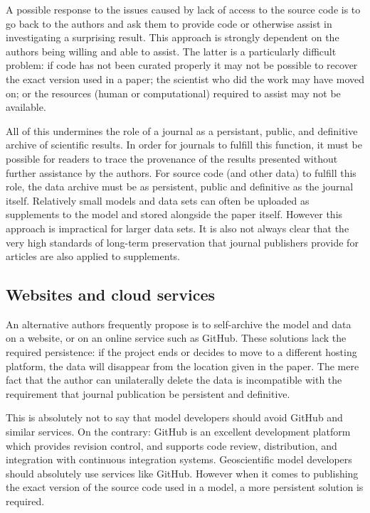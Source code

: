 \documentclass[a4paper,11pt]{article}
\begin{document}
A possible response to the issues caused by lack of access to the source
code is to go back to the authors and ask them to provide code or otherwise
assist in investigating a surprising result. This approach is strongly
dependent on the authors being willing and able to assist. The latter is a
particularly difficult problem: if code has not been curated properly it may
not be possible to recover the exact version used in a paper; the scientist
who did the work may have moved on; or the resources (human or
computational) required to assist may not be available.

All of this undermines the role of a journal as a persistant, public, and
definitive archive of scientific results. In order for journals to fulfill
this function, it must be possible for readers to trace the provenance of
the results presented without further assistance by the authors. For source
code (and other data) to fulfill this role, the data archive must be as
persistent, public and definitive as the journal itself. Relatively small
models and data sets can often be uploaded as supplements to the model and
stored alongside the paper itself. However this approach is impractical for
larger data sets. It is also not always clear that the very high standards
of long-term preservation that journal publishers provide for articles are
also applied to supplements. 

\subsection{Websites and cloud services}

An alternative authors frequently propose is to self-archive the model and data
on a website, or on an online service such as GitHub. These solutions lack
the required persistence: if the project ends or decides to move to a
different hosting platform, the data will disappear from the location given
in the paper. The mere fact that the author can unilaterally delete the data
is incompatible with the requirement that journal publication be persistent
and definitive.

This is absolutely not to say that model developers should avoid GitHub and
similar services. On the contrary: GitHub is an excellent development
platform which provides revision control, and supports code review,
distribution, and integration with continuous integration
systems. Geoscientific model developers should absolutely use services like
GitHub. However when it comes to publishing the exact version of the source
code used in a model, a more persistent solution is required.
\end{document}

